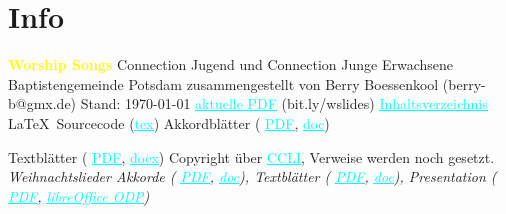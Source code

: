 \documentclass[xcolor=dvipsnames]{beamer}
\newcommand{\songtitle}[1]{\textcolor{yellow}{\textbf{#1}\vspace{0.5em}}}
\newcommand{\z}{\vspace{1em}}
\newcommand{\flink}[2]{\href{#2}{\textcolor{cyan}{\underline{#1}}}}
\begin{document}
\color{white}
\obeylines


\begin{frame1}
\label{blackslide}
\end{frame1}


\section{Info}
\begin{frame1}
\begin{center}
\songtitle{Worship Songs}
Connection Jugend und Connection Junge Erwachsene
Baptistengemeinde Potsdam 
zusammengestellt von Berry Boessenkool (berry-b@gmx.de)
\z
Stand: \today
\z
\flink{aktuelle PDF}{https://dl.dropboxusercontent.com/u/4836866/Akkorde/Worship_slides.pdf} (bit.ly/wslides)
\flink{Inhaltsverzeichnis}{https://dl.dropboxusercontent.com/u/4836866/Akkorde/inhalt.pdf}
\LaTeX\ Sourcecode (\flink{tex}{https://dl.dropboxusercontent.com/u/4836866/Akkorde/Worship_slides.tex})
Akkordblätter (%
\flink{PDF}{https://dl.dropboxusercontent.com/u/4836866/Akkorde/Worship_Chords.pdf}, %
\flink{doc}{https://dl.dropboxusercontent.com/u/4836866/Akkorde/Worship_Chords.doc})

Textblätter (%
\flink{PDF}{https://dl.dropboxusercontent.com/u/4836866/Akkorde/Worship_Text.pdf}, %
\flink{docx}{https://dl.dropboxusercontent.com/u/4836866/Akkorde/Worship_Text.docx})
\z
Copyright über \flink{CCLI}{http://ccli.de/liedlizenz}, Verweise werden noch gesetzt.
\z
\textit{Weihnachtslieder Akkorde (%
\flink{PDF}{https://dl.dropboxusercontent.com/u/4836866/Akkorde/ChristmasMusic_Chords.pdf}, %
\flink{doc}{https://dl.dropboxusercontent.com/u/4836866/Akkorde/ChristmasMusic_Chords.doc}), 
Textblätter (%
\flink{PDF}{https://dl.dropboxusercontent.com/u/4836866/Akkorde/ChristmasMusic_Text.pdf}, %
\flink{doc}{https://dl.dropboxusercontent.com/u/4836866/Akkorde/ChristmasMusic_Text.doc}), %
Presentation (%
\flink{PDF}{https://dl.dropboxusercontent.com/u/4836866/Akkorde/ChristmasMusic_Pres.pdf}, %
\flink{libreOffice ODP}{https://dl.dropboxusercontent.com/u/4836866/Akkorde/ChristmasMusic_Pres.odp})
}

\end{center}
\end{frame1}
\end{document}
